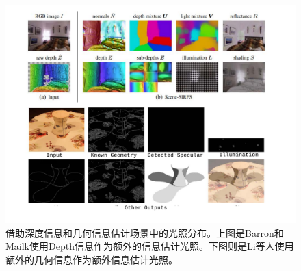 \begin{figure}[!htbp]
    \centering
    \includegraphics[width=1.0\textwidth]{Img/additional-input.pdf}

    \caption[使用额外信息辅助估计光照的方法]
    {借助深度信息和几何信息估计场景中的光照分布。上图是Barron和Mailk\cite{barron2013intrinsic}使用Depth信息作为额外的信息估计光照。下图则是Li等人\cite{li2003multiple}使用额外的几何信息作为额外信息估计光照。}
        
    \label{fig:additional-input}
\end{figure}